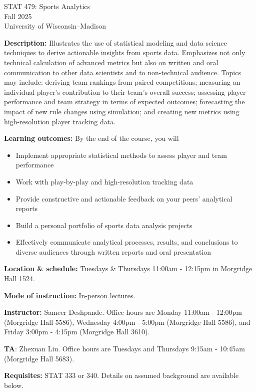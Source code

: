 \documentclass[11pt]{article}
\begin{document}
\begin{center}
\Large{STAT 479: Sports Analytics} \\
\large{Fall 2025} \\
University of Wisconsin--Madison
\end{center}

\singlespacing

\textbf{Description:} Illustrates the use of statistical modeling and data science techniques to derive actionable insights from sports data. Emphasizes not only technical calculation of advanced metrics but also on written and oral communication to other data scientists and to non-technical audience. Topics may include: deriving team rankings from paired competitions; measuring an individual player's contribution to their team's overall success; assessing player performance and team strategy in terms of expected outcomes; forecasting the impact of new rule changes using simulation; and creating new metrics using high-resolution player tracking data.

\textbf{Learning outcomes:} By the end of the course, you will
\begin{itemize}
\item{Implement appropriate statistical methods to assess player and team performance}
\item{Work with play-by-play and high-resolution tracking data}
\item{Provide constructive and actionable feedback on your peers' analytical reports}
\item{Build a personal portfolio of sports data analysis projects}
\item{Effectively communicate analytical processes, results, and conclusions to diverse audiences through written reports and oral presentation} 
\end{itemize}

\textbf{Location \& schedule:} Tuesdays \& Thursdays 11:00am - 12:15pm in Morgridge Hall 1524.

\textbf{Mode of instruction:} In-person lectures.

\textbf{Instructor:} Sameer Deshpande. Office hours are Monday 11:00am - 12:00pm (Morgridge Hall 5586), Wednesday 4:00pm - 5:00pm (Morgridge Hall 5586), and Friday 3:00pm - 4:15pm (Morgridge Hall 3610). 

\textbf{TA}: Zhexuan Liu. Office hours are Tuesdays and Thursdays 9:15am - 10:45am (Morgridge Hall 5683). 

\textbf{Requisites:} STAT 333 or 340. Details on assumed background are available below.
\end{document}
